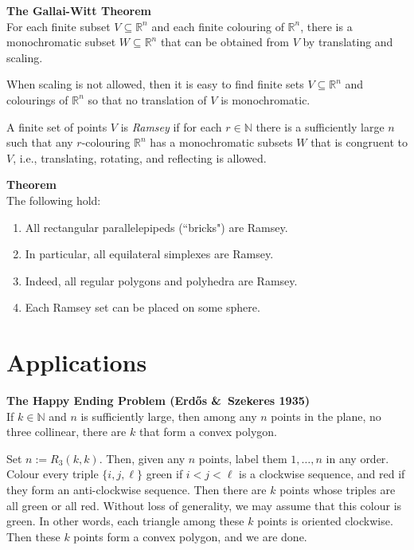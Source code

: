 \documentclass[a4paper]{article}
\let\oldendproof\endproof
\renewenvironment{proof}[1][\proofname]{%
  \oldproof[\scshape \noindent {\bfseries \text{Proof}}]%
}{\oldendproof}
\newcommand{\definition}{\bigskip\noindent{\bf Definition.}\;\;}
\newenvironment{thm}[1]{
	\begin{framed}
	\noindent
	{\bfseries #1}\\}{
	\end{framed}
}
\newcommand{\RR}{\mathbb{R}}
\begin{document}
\begin{thm}{The Gallai-Witt Theorem}
For each finite subset $V \subseteq \RR^n$ and each finite colouring of $\RR^n$,
there is a monochromatic subset $W \subseteq \RR^n$ that
can be obtained from $V$ by translating and scaling.
\end{thm}

When scaling is not allowed,
then it is easy to find finite sets $V \subseteq \RR^n$ and colourings of $\RR^n$ so that
no translation of $V$ is monochromatic.

\definition
A finite set of points $V$ is \emph{Ramsey}
if for each $r \in \mathbb{N}$ there is a sufficiently large $n$ such that
any $r$-colouring $\RR^n$ has a monochromatic subsets $W$ that is congruent to $V$,
i.e., translating, rotating, and reflecting is allowed.

\begin{thm}{Theorem}
	The following hold:
	\begin{enumerate}
		\item All rectangular parallelepipeds (``bricks") are Ramsey.
		\item In particular, all equilateral simplexes are Ramsey.
		\item Indeed, all regular polygons and polyhedra are Ramsey.
		\item Each Ramsey set can be placed on some sphere.
	\end{enumerate}
\end{thm}




\newpage
\section{Applications}

\begin{thm}{The Happy Ending Problem (Erd\H{o}s \&\ Szekeres 1935)}
If $k \in \mathbb{N}$ and $n$ is sufficiently large,
then among any $n$ points in the plane, no three collinear,
there are $k$ that form a convex polygon.
\end{thm}

\begin{proof}
Set $n:= R_3 (k,k)$.
Then, given any $n$ points, label them $1, \ldots, n$ in any order.
Colour every triple $\{i,j,\ell\}$ green if $i < j < \ell$ is a clockwise sequence,
and red if they form an anti-clockwise sequence.
Then there are $k$ points whose triples are all green or all red.
Without loss of generality, we may assume that this colour is green.
In other words, each triangle among these $k$ points is oriented clockwise.
Then these $k$ points form a convex polygon, and we are done.
\end{proof}
\end{document}
